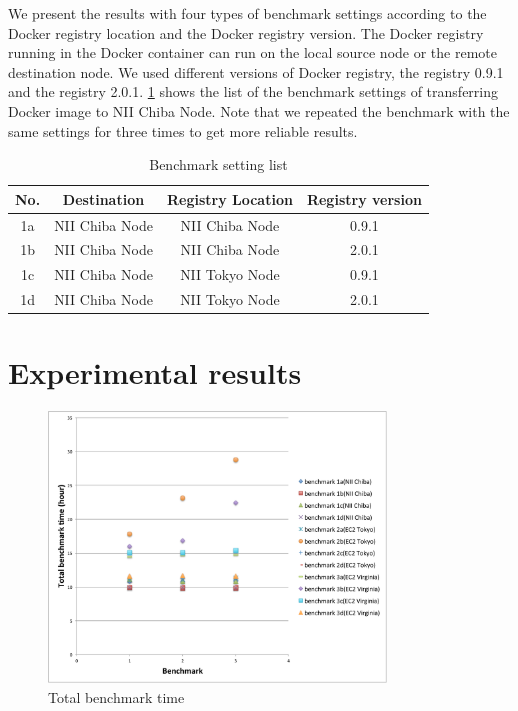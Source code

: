 \documentclass{ieicej}
\begin{document}
We present the results with four types of benchmark settings according to the Docker registry location and the Docker registry version.
The Docker registry running in the Docker container can run on the local source node or the remote destination node.
We used different versions of Docker registry, the registry 0.9.1 and the registry 2.0.1.
\cref{bench_set_l} shows the list of the benchmark settings of transferring Docker image to NII Chiba Node.
Note that we repeated the benchmark with the same settings for three times to get more reliable results.

\begin{table}[ht]
	\begin{tabular}{|c|c|c|c|}
\hline
    No. & Destination    & Registry Location & Registry version \\
\hline
    1a  & NII Chiba Node & NII Chiba Node    & 0.9.1 \\
\hline
    1b  & NII Chiba Node & NII Chiba Node    & 2.0.1 \\
\hline
    1c  & NII Chiba Node & NII Tokyo Node    & 0.9.1 \\
\hline
    1d  & NII Chiba Node & NII Tokyo Node    & 2.0.1 \\
\hline
	\end{tabular}
  \caption{Benchmark setting list}
  \label{bench_set_l}
\end{table}


\section{Experimental results}
\begin{figure}[ht]
  \begin{center}
  \includegraphics[width=0.8\textwidth,natwidth=900,natheight=600]{2_Total_benchmark_time.pdf}
  \end{center}
  \caption{Total benchmark time}
  \label{t_bench_t}
\end{figure}
\end{document}
